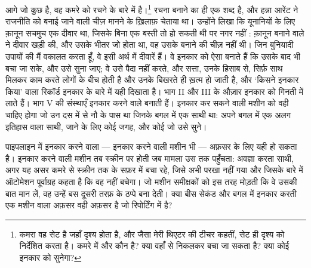 आगे जो कुछ है, वह कमरे को रचने के बारे में है।\footnote{कमरा वह सेट है जहाँ दृश्य होता है, और जैसा मेरी थिएटर की टीचर कहतीं, सेट ही दृश्य को निर्देशित करता है। कमरे में और कौन है? क्या वहाँ से निकलकर बचा जा सकता है? क्या कोई इनकार को सुनेगा?} रचना बनाने का ही एक शब्द है, और हन्ना आरेंट ने राजनीति को बनाई जाने वाली चीज़ मानने के ख़िलाफ़ चेताया था। उन्होंने लिखा कि यूनानियों के लिए क़ानून सचमुच एक दीवार था, जिसके बिना एक बस्ती तो हो सकती थी पर नगर नहीं \autocite{arendt1958human}: क़ानून बनाने वाले ने दीवार खड़ी की, और उसके भीतर जो होता था, वह उसके बनाने की चीज़ नहीं थी। जिन बुनियादी उपायों की मैं वकालत करता हूँ, वे इसी अर्थ में दीवारें हैं। वे इनकार को ऐसा बनाते हैं कि उसके बाद भी बचा जा सके, और उसे सुना जाए; वे उसे पैदा नहीं करते, और सत्ता, उनके हिसाब से, सिर्फ़ साथ मिलकर काम करते लोगों के बीच होती है और उनके बिखरते ही ख़त्म हो जाती है, और ‘किसने इनकार किया’ वाला रिकॉर्ड इनकार के बारे में यही दिखाता है। भाग II और III के औज़ार इनकार को गिनती में लाते हैं। भाग V की संस्थाएँ इनकार करने वाले बनाती हैं। इनकार कर सकने वाली मशीन को वही चाहिए होगा जो उन दस में से नौ के पास था जिनके बगल में एक साथी था: अपने बगल में एक अलग इतिहास वाला साथी, जाने के लिए कोई जगह, और कोई जो उसे सुने।

पाइपलाइन में इनकार करने वाला — इनकार करने वाली मशीन भी — अफ़सर के लिए यही हो सकता है। इनकार करने वाली मशीन तब स्क्रीन पर होती जब मामला उस तक पहुँचता: अवज्ञा करता साथी, अगर यह असर कमरे से स्क्रीन तक के सफ़र में बचा रहे, जिसे अभी परखा नहीं गया और जिसके बारे में ऑटोमेशन पूर्वाग्रह कहता है कि वह नहीं बचेगा। जो मशीन समीक्षकों को इस तरह मोड़ती कि वे उसकी बात मान लें, वह उन्हें बस दूसरी तरफ़ के ठप्पे बना देती। क्या बीस सेकंड और बगल में इनकार करती एक मशीन वाला अफ़सर वही अफ़सर है जो रिपोर्टिंग में है?
